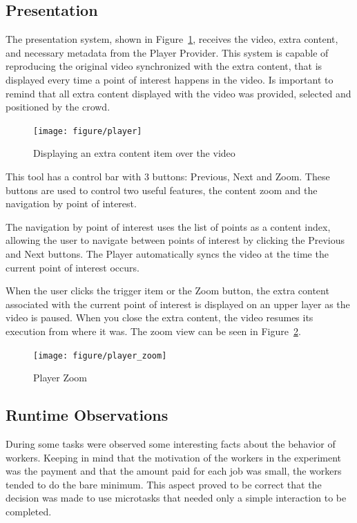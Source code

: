 \subsection{Presentation}

The presentation system, shown in Figure~\ref{player}, receives the video, extra content, and necessary metadata from the Player Provider. This system is capable of reproducing the original video synchronized with the extra content, that is displayed every time a point of interest happens in the video. Is important to remind that all extra content displayed with the video was provided, selected and positioned by the crowd.



\begin{figure}[h!]
	\centerline{\texttt{[image: figure/player]}}
	\caption{Displaying an extra content item over the video}
	\label{player}
\end{figure}

This tool has a control bar with 3 buttons: Previous, Next and Zoom. These buttons are used to control two useful features, the content zoom and the navigation by point of interest.

The navigation by point of interest uses the list of points as a content index, allowing the user to navigate between points of interest by clicking the Previous and Next buttons. The Player automatically syncs the video at the time the current point of interest occurs.

When the user clicks the trigger item or the Zoom button, the extra content associated with the current point of interest is displayed on an upper layer as the video is paused. When you close the extra content, the video resumes its execution from where it was. The zoom view can be seen in Figure~\ref{player_zoom}.

\begin{figure}[h!]
	\centerline{\texttt{[image: figure/player\_zoom]}}
	\caption{Player Zoom}
	\label{player_zoom}
\end{figure}



 \subsection{Runtime Observations}
 
During some tasks were observed some interesting facts about the behavior of workers. Keeping in mind that the motivation of the workers in the experiment was the payment and that the amount paid for each job was small, the workers tended to do the bare minimum. This aspect proved to be correct that the decision was made to use microtasks that needed only a simple interaction to be completed.
 

